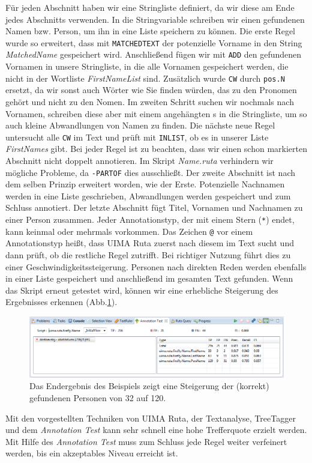 \documentclass{article}
\begin{document}
Für jeden Abschnitt haben wir eine Stringliste definiert, da wir diese am Ende jedes Abschnitts verwenden. In die Stringvariable schreiben wir einen gefundenen Namen bzw. Person, um ihn in eine Liste speichern zu können. Die erste Regel wurde so erweitert, dass mit \texttt{MATCHEDTEXT} der potenzielle Vorname in den String \textit{MatchedName} gespeichert wird. Anschließend fügen wir mit \texttt{ADD} den gefundenen Vornamen in unsere Stringliste, in die alle Vornamen gespeichert werden, die nicht in der Wortliste \textit{FirstNameList} sind. Zusätzlich wurde \texttt{CW} durch \texttt{pos.N} ersetzt, da wir sonst auch Wörter wie \glqq Sie\grqq{} finden würden, das zu den Pronomen gehört und nicht zu den Nomen. Im zweiten Schritt suchen wir nochmals nach Vornamen, schreiben diese aber mit einem angehängten \glqq s\grqq{} in die Stringliste, um so auch kleine Abwandlungen von Namen zu finden. Die nächste neue Regel untersucht alle \texttt{CW} im Text und prüft mit \texttt{INLIST}, ob es in unserer Liste \textit{FirstNames} gibt. Bei jeder Regel ist zu beachten, dass wir einen schon markierten Abschnitt nicht doppelt annotieren. Im Skript \textit{Name.ruta} verhindern wir mögliche Probleme, da \texttt{-PARTOF} dies ausschließt. Der zweite Abschnitt ist nach dem selben Prinzip erweitert worden, wie der Erste. Potenzielle Nachnamen werden in eine Liste geschrieben, Abwandlungen werden gespeichert und zum Schluss annotiert. Der letzte Abschnitt fügt Titel, Vornamen und Nachnamen zu einer Person zusammen. Jeder Annotationstyp, der mit einem Stern (\texttt{*}) endet, kann keinmal oder mehrmals vorkommen. Das Zeichen \texttt{@} vor einem Annotationstyp heißt, dass UIMA Ruta zuerst nach diesem im Text sucht und dann prüft, ob die restliche Regel zutrifft. Bei richtiger Nutzung führt dies zu einer Geschwindigkeitssteigerung. Personen nach direkten Reden werden ebenfalls in einer Liste gespeichert und anschließend im gesamten Text gefunden. Wenn das Skript erneut getestet wird, können wir eine erhebliche Steigerung des Ergebnisses erkennen (Abb.\ref{final_result}). 

\begin{figure}
\centering
\includegraphics[width=1\textwidth]{figs/final_result.png}
\caption{Das Endergebnis des Beispiels zeigt eine Steigerung der (korrekt) gefundenen Personen von 32 auf 120.}
\label{final_result}
\end{figure}

Mit den vorgestellten Techniken von UIMA Ruta, der Textanalyse, TreeTagger und dem \textit{Annotation Test} kann sehr schnell eine hohe Trefferquote erzielt werden. Mit Hilfe des \textit{Annotation Test} muss zum Schluss jede Regel weiter verfeinert werden, bis ein akzeptables Niveau erreicht ist.
\end{document}
